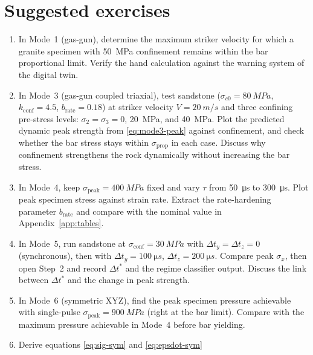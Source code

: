\documentclass[11pt,a4paper,openany]{book}
\providecommand{\SI}[2]{\qty{#1}{#2}}
\theoremstyle{handbook}
\newcommand{\sig}{\sigma}
\newcommand{\sigprop}{\sig_{\text{prop}}}
\newcommand{\sigpeak}{\sig_{\text{peak}}}
\begin{document}
\chapter{Suggested exercises}\label{app:exercises}

\begin{enumerate}[leftmargin=*,itemsep=4pt]
  \item In Mode~1 (gas-gun), determine the maximum striker velocity for
        which a granite specimen with \SI{50}{MPa} confinement remains
        within the bar proportional limit. Verify the hand calculation
        against the warning system of the digital twin.
  \item In Mode~3 (gas-gun coupled triaxial), test sandstone
        ($\sig_{c0}=\SI{80}{MPa}$, $k_{\text{conf}}=4.5$,
        $b_{\text{rate}}=0.18$) at striker velocity $V=\SI{20}{m/s}$ and
        three confining pre-stress levels: $\sig_2=\sig_3=0$,
        \SI{20}{MPa}, and \SI{40}{MPa}. Plot the predicted dynamic peak
        strength from \eqref{eq:mode3-peak} against confinement, and check
        whether the bar stress stays within $\sigprop$ in each case.
        Discuss why confinement strengthens the rock dynamically without
        increasing the bar stress.
  \item In Mode~4, keep $\sigpeak=\SI{400}{MPa}$ fixed and vary $\tau$ from
        \SI{50}{\micro s} to \SI{300}{\micro s}. Plot peak specimen stress
        against strain rate. Extract the rate-hardening parameter
        $b_{\text{rate}}$ and compare with the nominal value in
        Appendix~\ref{app:tables}.
  \item In Mode~5, run sandstone at $\sig_{\text{conf}}=\SI{30}{MPa}$ with
        $\Delta t_y=\Delta t_z=0$ (synchronous), then with
        $\Delta t_y=\SI{100}{\micro s}$, $\Delta t_z=\SI{200}{\micro s}$.
        Compare peak $\sig_x$, then open Step~2 and record
        $\Delta t^{\ast}$ and the regime classifier output. Discuss the
        link between $\Delta t^{\ast}$ and the change in peak strength.
  \item In Mode~6 (symmetric XYZ), find the peak specimen pressure
        achievable with single-pulse $\sigpeak=\SI{900}{MPa}$ (right at
        the bar limit). Compare with the maximum pressure achievable in
        Mode~4 before bar yielding.
  \item Derive equations \eqref{eq:sig-sym} and \eqref{eq:epsdot-sym}

\end{enumerate}
\end{document}
